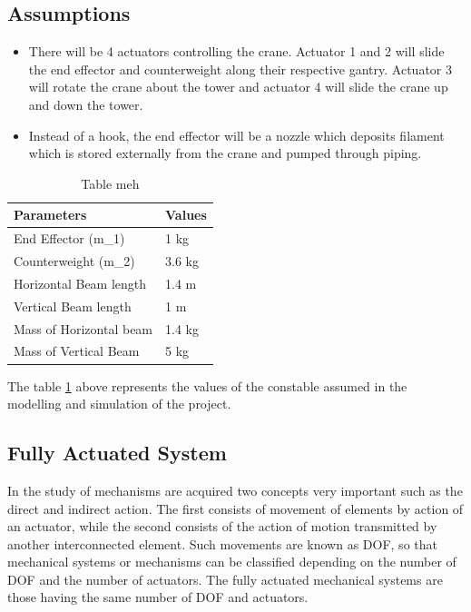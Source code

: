 \documentclass{UoNMCHA}
\numberwithin{equation}{section}
\begin{document}
\subsection*{Assumptions}
\begin{itemize}
	\item There will be 4 actuators controlling the crane. Actuator 1 and 2 will slide the end effector and counterweight along their respective gantry. Actuator 3 will rotate the crane about the tower and actuator 4 will slide the crane up and down the tower. 
	\item Instead of a hook, the end effector will be a nozzle which deposits filament which is stored externally from the crane and pumped through piping.
	
\end{itemize}


\begin{table}[H] \centering 
	\caption{Table meh}
	\begin{tabular}{ll}
		\hline
		Parameters              & Values \\ \hline 
		End Effector (m\_1)     & 1 kg   \\ 
		Counterweight (m\_2)    & 3.6 kg \\ 
		Horizontal Beam length  & 1.4 m  \\ 
		Vertical Beam length    & 1 m    \\ 
		Mass of Horizontal beam & 1.4 kg \\ 
		Mass of Vertical Beam   & 5 kg  
	\end{tabular}
	\label{tab:physical param}
\end{table}

The table \ref{tab:physical param} above represents the values of the constable assumed in the modelling and simulation of the project.


\subsection{Fully Actuated System}

In the study of mechanisms are acquired two concepts very important such as the direct and indirect action. The first consists of movement of elements by action of an actuator, while the second consists of the action of motion transmitted by another interconnected element. Such movements are known as DOF, so that mechanical systems or mechanisms can be classified depending on the number of DOF and the number of actuators. The fully actuated mechanical systems are those having the same number of DOF and actuators. \\
\end{document}
